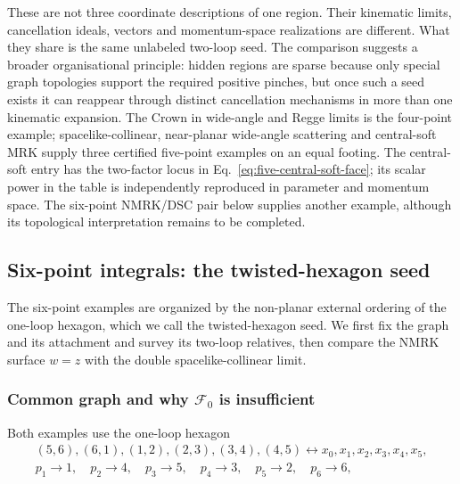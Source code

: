 \documentclass[a4paper,11pt]{article}
\begin{document}
These are not three coordinate descriptions of one region.  Their kinematic
limits, cancellation ideals, vectors and momentum-space realizations are
different.  What they share is the same unlabeled two-loop seed.  The
comparison suggests a broader organisational principle: hidden regions are
sparse because only special graph topologies support the required positive
pinches, but once such a seed exists it can reappear through distinct
cancellation mechanisms in more than one kinematic expansion.  The Crown in
wide-angle and Regge limits is the four-point example; spacelike-collinear,
near-planar wide-angle scattering and central-soft MRK supply three certified
five-point examples on an equal footing.  The central-soft entry has the
two-factor locus in Eq.~\eqref{eq:five-central-soft-face}; its scalar power in
the table is independently reproduced in parameter and momentum space.  The
six-point NMRK/DSC pair below
supplies another example, although its topological interpretation remains to
be completed.

\subsection{Six-point integrals: the twisted-hexagon seed}
\label{sec:example-alignment}

The six-point examples are organized by the non-planar external ordering of
the one-loop hexagon, which we call the twisted-hexagon seed.  We first fix
the graph and its attachment and survey its two-loop relatives, then compare
the NMRK surface \(w=z\) with the double spacelike-collinear limit.

\subsubsection{Common graph and why \texorpdfstring{\(\mathcal F_0\)}{F0} is insufficient}

Both examples use the one-loop hexagon
\begin{equation}
 \begin{gathered}
 (5,6),(6,1),(1,2),(2,3),(3,4),(4,5)
 \longleftrightarrow x_0,x_1,x_2,x_3,x_4,x_5,\\
 p_1\to1,\quad p_2\to4,\quad p_3\to5,\quad
 p_4\to3,\quad p_5\to2,\quad p_6\to6,
 \end{gathered}
 \label{eq:hexagon-edge-map}
\end{equation}
\end{document}
